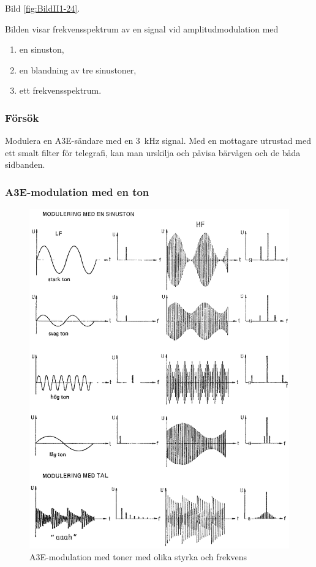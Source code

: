 Bild \ref{fig:BildII1-24}.

Bilden visar frekvensspektrum av en signal vid amplitudmodulation med

\begin{enumerate}[label=\alph*.,noitemsep]
\item en sinuston,
\item en blandning av tre sinustoner,
\item ett frekvensspektrum.
\end{enumerate}

\subsubsection{Försök}

Modulera en A3E-sändare med en 3~kHz signal. Med en mottagare utrustad med ett
smalt filter för telegrafi, kan man urskilja och påvisa bärvågen och de båda
sidbanden.

\subsubsection{A3E-modulation med en ton}

\begin{figure}
\includegraphics[width=\textwidth]{images/cropped_pdfs/bild_2_1-25.pdf}
\caption{A3E-modulation med toner med olika styrka och frekvens}
\label{fig:BildII1-25}
\end{figure}

